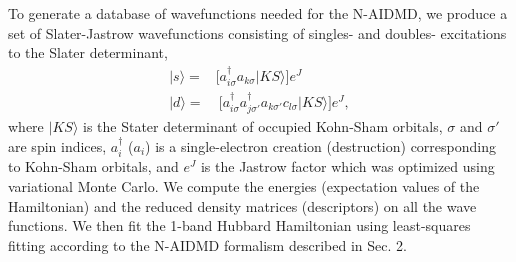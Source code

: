 To generate a database of wavefunctions needed for the N-AIDMD, we produce a set of Slater-Jastrow 
wavefunctions consisting of singles- and doubles- excitations to the Slater determinant, 
\begin{subequations}
\begin{eqnarray}
| s \rangle = & \Big[a^\dagger_{i \sigma} a_{k \sigma}   | KS \rangle \Big]e^J \\
| d \rangle = & \: \Big[a^\dagger_{i \sigma} a^\dagger_{j \sigma'} a_{k \sigma'} c_{l \sigma}   | KS \rangle\Big]e^J ,
\end{eqnarray}
\end{subequations}
where $|KS\rangle$ is the Stater determinant of occupied Kohn-Sham orbitals, $\sigma$ and $\sigma'$ are spin indices, 
$a_{i}^\dagger$ ($a_{i}$) is a single-electron creation (destruction) corresponding to Kohn-Sham orbitals, 
and $e^J$ is the Jastrow factor which was optimized using variational Monte Carlo. 
We compute the energies (expectation values of the Hamiltonian) and the reduced density matrices (descriptors) on all the wave functions. 
We then fit the 1-band Hubbard Hamiltonian using least-squares fitting according to the N-AIDMD formalism described in Sec. 2. %

